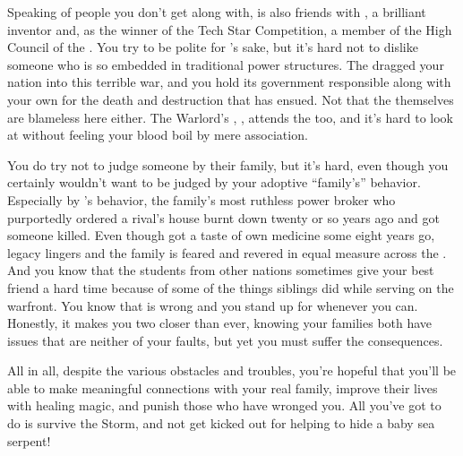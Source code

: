 \documentclass[char]{GL2020}
\begin{document}
Speaking of people you don’t get along with, \cDisney{} is also friends with \cTechStar{\full}, a brilliant inventor and, as the winner of the Tech Star Competition, a member of the High Council of the \pTech{}. You try to be polite for \cDisney{}’s sake, but it's hard not to dislike someone who is so embedded in traditional power structures. The \pTech{} dragged your nation into this terrible war, and you hold its government responsible along with your own for the death and destruction that has ensued. Not that the \pShip{} themselves are blameless here either. The Warlord's \cWarlordDaughter{\child}, \cWarlordDaughter{}, attends the \pSchool{} too, and it's hard to look at \cWarlordDaughter{\them} without feeling your blood boil by mere association. 

You do try not to judge someone by their family, but it’s hard, even though you certainly wouldn't want to be judged by your adoptive ``family’s” behavior. Especially by \cEvilNemesis{\full}’s behavior, the family’s most ruthless power broker who purportedly ordered a rival’s house burnt down twenty or so years ago and got someone killed. Even though \cEvilNemesis{\they} got a taste of \cEvilNemesis{\their} own medicine some eight years go, \cEvilNemesis{\their} legacy lingers and the \cAdopted{\formal} family is feared and revered in equal measure across the \pFarm{}. And you know that the students from other nations sometimes give your best friend \cLibAssist{} a hard time because of some of the things \cLibAssist{\their} siblings did while serving on the warfront. You know that is wrong and you stand up for \cLibAssist{} whenever you can. Honestly, it makes you two closer than ever, knowing your families both have issues that are neither of your faults, but yet you must suffer the consequences.

All in all, despite the various obstacles and troubles, you're hopeful that you'll be able to make meaningful connections with your real family, improve their lives with healing magic, and punish those who have wronged you. All you've got to do is survive the Storm, and not get kicked out for helping to hide a baby sea serpent!
\end{document}
